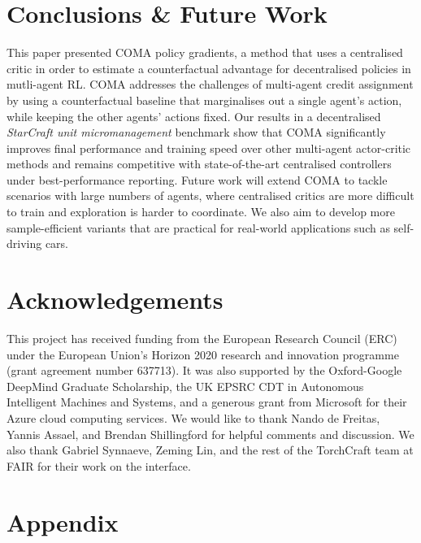 \documentclass[letterpaper]{article}
\begin{document}

\section{Conclusions \& Future Work}
\label{sec:conclusion}

This paper presented COMA policy gradients, a method that uses a centralised 
critic in order to estimate a counterfactual advantage for decentralised 
policies in mutli-agent RL. COMA addresses the challenges of multi-agent credit 
assignment by using a counterfactual baseline that marginalises out a single 
agent's action, while keeping the other agents' actions fixed. Our results in a 
decentralised \emph{StarCraft unit micromanagement} benchmark show that COMA 
significantly improves final performance and training speed over other 
multi-agent actor-critic methods and remains competitive with state-of-the-art 
centralised controllers under best-performance reporting. Future work will 
extend COMA to tackle scenarios with large numbers of agents, where centralised 
critics are more difficult to train and exploration is harder to coordinate. We 
also aim to develop more  sample-efficient variants that are practical for 
real-world applications such as self-driving cars.

\section*{Acknowledgements} 
This project has received funding from the European Research Council (ERC) under the European Union's Horizon 2020 research and innovation programme (grant agreement number 637713).  It was also supported by the Oxford-Google DeepMind Graduate Scholarship, the 
UK EPSRC CDT in Autonomous Intelligent Machines and Systems, and a generous 
grant from Microsoft for their Azure cloud computing services.
We would like to thank Nando de Freitas, Yannis Assael, and Brendan Shillingford
for helpful comments and discussion. We also thank Gabriel Synnaeve, Zeming Lin,
and the rest of the TorchCraft team at FAIR for their work on the interface.





\newpage
\onecolumn
\section*{Appendix}
\end{document}
